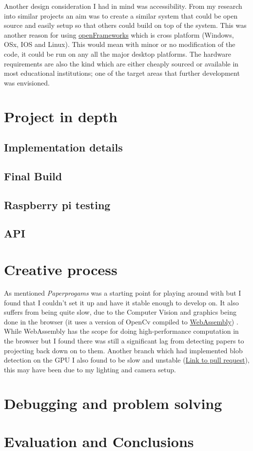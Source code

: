 \documentclass[12pt]{report}
\begin{document}
Another design consideration I had in mind was accessibility. From my research
into similar projects an aim was to create a similar system that could be open
source and easily setup so that others could build on top of the system. This
was another reason for using \href{https://openframeworks.cc/download/}{openFrameworks} which is cross platform (Windows,
OSx, IOS and Linux). This would mean with minor or no modification of the code,
it could be run on any all the major desktop platforms. The hardware
requirements are also the kind which are either cheaply sourced or available in
most educational institutions; one of the target areas that further development
was envisioned.


\chapter{Project in depth \label{projectindepth}}
\label{sec:org3ad81b7}


\section{Implementation details}
\label{sec:orgb6f4c45}



\section{Final Build}
\label{sec:orge1055e3}

\section{Raspberry pi testing}
\label{sec:org153c109}

\section{API}
\label{sec:org9ff8f81}

\chapter{Creative process}
\label{sec:orgff8257d}

As mentioned \emph{Paperprogams} was a starting point for playing around with but I found that I
couldn't set it up and have it stable enough to develop on. It also suffers from
being quite slow, due to the Computer Vision and graphics being done in the
browser (it uses a version of OpenCv compiled to \href{https://webassembly.org/}{WebAssembly})
\cite{JpPaperPrograms}. While WebAssembly has the scope for doing high-performance
computation in the browser but I found there was still a significant lag from
detecting papers to projecting back down on to them. Another branch which had
implemented blob detection on the GPU I also found to be slow and unstable (\href{https://github.com/janpaul123/paperprograms/pull/28}{Link
to pull request}), this may have been due to my lighting and camera setup.


\chapter{Debugging and problem solving}
\label{sec:org6c6f0e9}
\chapter{Evaluation and Conclusions}
\label{sec:orgbeda551}
 

\end{document}
